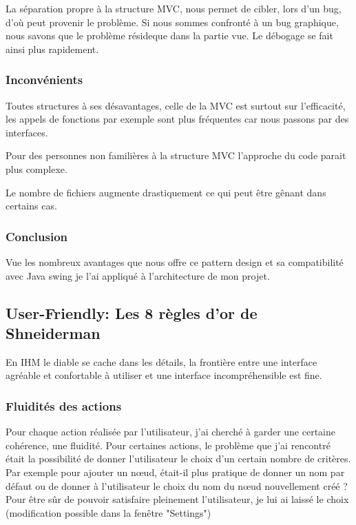 \documentclass[french]{article}
\begin{document}
    La séparation propre à la structure MVC, nous permet de cibler,
    lors d'un bug, d'où peut provenir le problème. Si nous sommes confronté
    à un bug graphique, nous savons que le problème
    résideque dans la partie vue. Le débogage se fait ainsi plus rapidement.


  \subsubsection{Inconvénients}

    Toutes structures à ses désavantages, celle de la MVC est surtout
    sur l'efficacité, les appels de fonctions par exemple sont plus fréquentes
    car nous passons par des interfaces.

    Pour des personnes non familières à la structure MVC l'approche
    du code parait plus complexe.

    Le nombre de fichiers augmente drastiquement ce qui peut être gênant
    dans certains cas.
  \subsubsection{Conclusion}
  Vue les nombreux avantages que nous offre ce pattern design  et sa compatibilité avec Java swing je l'ai appliqué à l'architecture de mon projet. 
  \subsection{User-Friendly: Les 8 règles d'or de Shneiderman}

    En IHM le diable se cache dans les détails, la frontière entre
    une interface agréable et confortable à utiliser et une interface incompréhensible
    est fine.


  \subsubsection{Fluidités des actions}

    Pour chaque action réalisée par l'utilisateur, j'ai cherché à garder
    une certaine cohérence, une fluidité. Pour certaines actions, le problème
    que j'ai rencontré était la possibilité de donner l'utilisateur le choix d'un
    certain nombre de critères. Par exemple pour ajouter un nœud, était-il
    plus pratique de donner un nom par défaut ou de donner à l'utilisateur le choix 
    du nom du nœud nouvellement créé ? Pour être sûr de pouvoir satisfaire
    pleinement l'utilisateur, je lui ai laissé le choix (modification
    possible dans la fenêtre "Settings")
\end{document}

